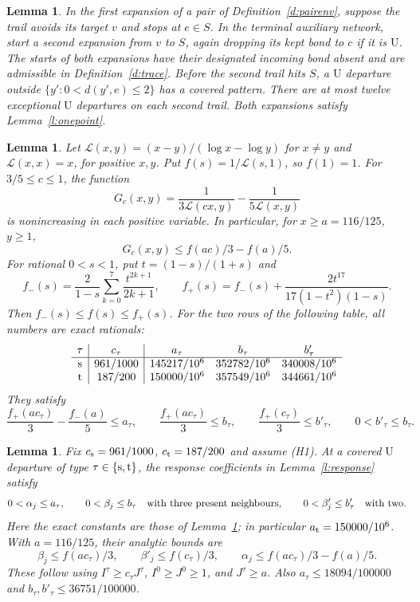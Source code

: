 \documentclass[11pt,reqno]{amsart}
\newtheorem{lemma}[theorem]{Lemma}
\theoremstyle{definition}
\theoremstyle{remark}
\begin{document}
\begin{lemma}\label{l:terminalcover}
In the first expansion of a pair of Definition~\ref{d:pairenv},
suppose the trail avoids its target \(v\) and stops at \(e\in S\).
In the terminal auxiliary network, start a second expansion from \(v\)
to \(S\), again dropping its kept bond to \(c\) if it is \(\mathrm U\).
The starts of both expansions have their designated incoming bond
absent and are admissible in Definition~\ref{d:trace}.
Before the second trail hits \(S\), a \(\mathrm U\) departure
outside \(\{y':0<d(y',e)\le2\}\) has a covered pattern.
There are at most twelve exceptional \(\mathrm U\) departures
on each second trail. Both expansions satisfy Lemma~\ref{l:onepoint}.
\end{lemma}

\begin{lemma}\label{l:log-mean-bounds}
Let \(\mathcal L(x,y)=(x-y)/(\log x-\log y)\) for \(x\ne y\)
and \(\mathcal L(x,x)=x\), for positive \(x,y\).
Put \(f(s)=1/\mathcal L(s,1)\), so \(f(1)=1\).
For \(3/5\le c\le1\), the function
\[
 G_c(x,y)=\frac1{3\mathcal L(cx,y)}-\frac1{5\mathcal L(x,y)}
\]
is nonincreasing in each positive variable. In particular,
for \(x\ge a=116/125\), \(y\ge1\),
\[
 G_c(x,y)\le f(ac)/3-f(a)/5.
\]
For rational \(0<s<1\), put \(t=(1-s)/(1+s)\) and
\[
 f_-(s)=\frac2{1-s}\sum_{k=0}^{7}\frac{t^{2k+1}}{2k+1},
 \qquad
 f_+(s)=f_-(s)+\frac{2t^{17}}{17(1-t^2)(1-s)}.
\]
Then \(f_-(s)\le f(s)\le f_+(s)\).
For the two rows of the following table, all numbers are exact rationals:
\[
 \begin{array}{c|c|ccc}
 \tau&c_\tau&a_\tau&b_\tau&b'_\tau\\ \hline
 {\rm s}&961/1000&145217/10^6&352782/10^6&340008/10^6\\
 {\rm t}&187/200&150000/10^6&357549/10^6&344661/10^6
 \end{array}
\]
They satisfy
\[
 \frac{f_+(ac_\tau)}3-\frac{f_-(a)}5\le a_\tau,\qquad
 \frac{f_+(ac_\tau)}3\le b_\tau,\qquad
 \frac{f_+(c_\tau)}3\le b'_\tau,\qquad
 0<b'_\tau\le b_\tau .
\]
\end{lemma}

\begin{lemma}\label{l:response-typed}
Fix \(c_{\rm s}=961/1000\), \(c_{\rm t}=187/200\) and assume (H1).
At a covered \(\mathrm U\) departure of type \(\tau\in\{{\rm s},{\rm t}\}\),
the response coefficients in Lemma~\ref{l:response} satisfy
\[
 0<\alpha_j\le a_\tau,\qquad 0<\beta_j\le b_\tau
       \quad\hbox{with three present neighbours},\qquad
 0<\beta'_j\le b'_\tau\quad\hbox{with two}.
\]
Here the exact constants are those of Lemma~\ref{l:log-mean-bounds};
in particular \(a_{\rm t}=150000/10^6\).
With \(a=116/125\), their analytic bounds are
\[
 \beta_j\le f(ac_\tau)/3,\qquad
 \beta'_j\le f(c_\tau)/3,\qquad
 \alpha_j\le f(ac_\tau)/3-f(a)/5.
\]
These follow using \(I^\tau\ge c_\tau J^\tau\),
\(I^0\ge J^0\ge1\), and \(J^\tau\ge a\).
Also \(a_\tau\le18094/100000\) and
\(b_\tau,b'_\tau\le36751/100000\).
\end{lemma}
\end{document}
